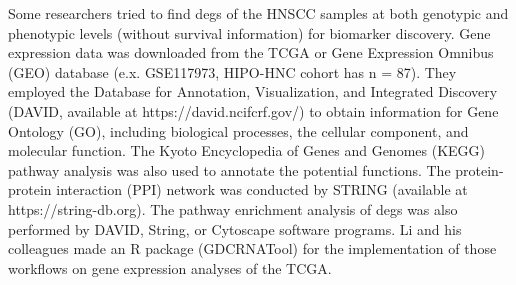 \documentclass[preprint,12pt]{elsarticle}
\newenvironment{MyIndent}
{\par\leftskip1cm\relax\rightskip1cm\relax}
{\par\leftskip0cm\relax\rightskip0cm\relax}
\newenvironment{MyColorPar}[1]{%
    \leavevmode\color{#1}\ignorespaces%
}{%
}%
\begin{document}
\begin{MyColorPar}{blue}
\begin{MyIndent}
\begin{MyColorPar}{red}
Some researchers\cite{Loraine2015a}\cite{Tonella2017a}\cite{Zhao2018}\cite{Li2018a}\cite{Huang2019}\cite{Shen2019}\cite{Schmitt2019}\cite{Xu2021a} tried to find \acrfull{degs} of the HNSCC samples at both genotypic and phenotypic levels (without survival information) for biomarker discovery.
Gene expression data was downloaded from the TCGA or Gene Expression Omnibus (GEO) database (e.x. GSE117973\cite{Schmitt2019}, HIPO-HNC cohort has n = 87).
They employed the Database for Annotation, Visualization, and Integrated Discovery (DAVID, available at https://david.ncifcrf.gov/) to obtain information for Gene Ontology (GO), including biological processes, the cellular component, and molecular function. 
The Kyoto Encyclopedia of Genes and Genomes (KEGG) pathway analysis was also used to annotate the potential functions.
The protein-protein interaction (PPI) network was conducted by STRING (available at https://string-db.org).
The pathway enrichment analysis of \acrshort{degs} was also performed by DAVID, String, or Cytoscape software programs\cite{Huang2019}\cite{Shen2019}.
Li\cite{Li2018a} and his colleagues made an R package (GDCRNATool) for the implementation of those workflows on gene expression analyses of the TCGA.

\end{MyColorPar}
\end{MyIndent}
\end{MyColorPar}
\end{document}
